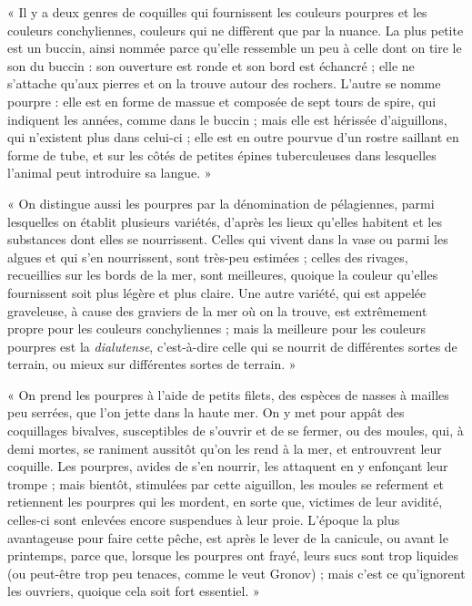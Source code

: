 \documentclass[a4paper, 11pt, oneside, polutonikogreek, french]{article}
\begin{document}
« Il y a deux genres de coquilles qui fournissent les couleurs pourpres et les couleurs conchyliennes, couleurs qui ne diffèrent que par la nuance. La plus petite est un buccin, ainsi nommée parce qu'elle ressemble un peu à celle dont on tire le son du buccin : son ouverture est ronde et son bord est échancré ; elle ne s'attache qu'aux pierres et on la trouve autour des rochers. L'autre se nomme pourpre : elle est en forme de massue et composée de sept tours de spire, qui indiquent les années, comme dans le buccin ; mais elle est hérissée d'aiguillons, qui n'existent plus dans celui-ci ; elle est en outre pourvue d'un rostre saillant en forme de tube, et sur les côtés de petites épines tuberculeuses dans lesquelles l'animal peut introduire sa langue. »

« On distingue aussi les pourpres par la dénomination de pélagiennes, parmi lesquelles on établit plusieurs variétés, d'après les lieux qu'elles habitent et les substances dont elles se nourrissent. Celles qui vivent dans la vase ou parmi les algues et qui s'en nourrissent, sont très-peu estimées ; celles des rivages, recueillies sur les bords de la mer, sont meilleures, quoique la couleur qu'elles fournissent soit plus légère et plus claire. Une autre variété, qui est appelée graveleuse, à cause des graviers de la mer où on la trouve, est extrêmement propre pour les couleurs conchyliennes ; mais la meilleure pour les couleurs pourpres est la \emph{dialutense}, c'est-à-dire celle qui se nourrit de différentes sortes de terrain, ou mieux sur différentes sortes de terrain. »

« On prend les pourpres à l'aide de petits filets, des espèces de nasses à mailles peu serrées, que l'on jette dans la haute mer. On y met pour appât des coquillages bivalves, susceptibles de s'ouvrir et de se fermer, ou des moules, qui, à demi mortes, se raniment aussitôt qu'on les rend à la mer, et entrouvrent leur coquille. Les pourpres, avides de s'en nourrir, les attaquent en y enfonçant leur trompe ; mais bientôt, stimulées par cette aiguillon, les moules se referment et retiennent les pourpres qui les mordent, en sorte que, victimes de leur avidité, celles-ci sont enlevées encore suspendues à leur proie. L'époque la plus avantageuse pour faire cette pêche, est après le lever de la canicule, ou avant le printemps, parce que, lorsque les pourpres ont frayé, leurs sucs sont trop liquides (ou peut-être trop peu tenaces, comme le veut Gronov) ; mais c'est ce qu'ignorent les ouvriers, quoique cela soit fort essentiel. »
\end{document}

